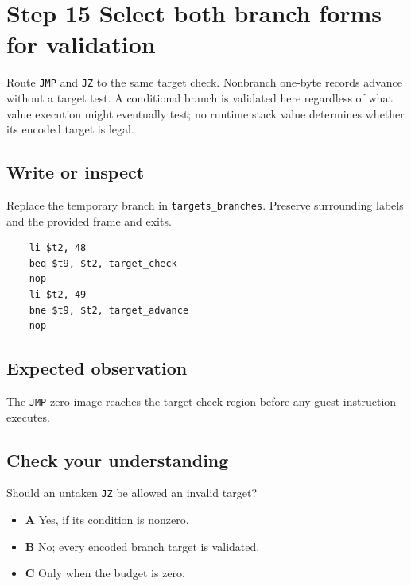 \section{Step 15 Select both branch forms for validation}\label{vm-s15}

Route \texttt{JMP} and \texttt{JZ} to the same target check. Nonbranch one-byte records advance without a target test. A conditional branch is validated here regardless of what value execution might eventually test; no runtime stack value determines whether its encoded target is legal.

\subsection{Write or inspect}
Replace the temporary branch in \texttt{targets\_branches}. Preserve surrounding labels and the provided frame and exits.

\begin{verbatim}
    li $t2, 48
    beq $t9, $t2, target_check
    nop
    li $t2, 49
    bne $t9, $t2, target_advance
    nop
\end{verbatim}
\subsection{Expected observation}
The \texttt{JMP} zero image reaches the target-check region before any guest instruction executes.

\subsection{Check your understanding}
Should an untaken \texttt{JZ} be allowed an invalid target?

\begin{itemize}
  \item \textbf{A} Yes, if its condition is nonzero.
  \item \textbf{B} No; every encoded branch target is validated.
  \item \textbf{C} Only when the budget is zero.
\end{itemize}
